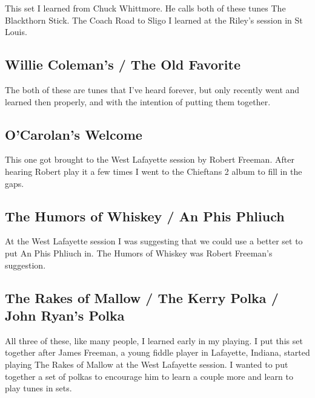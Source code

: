 \documentclass[11pt,letterpaper]{article}
\begin{document}
This set I learned from Chuck Whittmore. He calls both of these tunes The Blackthorn Stick. The Coach Road to Sligo I learned at the Riley's session in St Louis.

\subsection{Willie Coleman's / The Old Favorite}

The  both of these are tunes that I've heard forever, but only recently went and learned then properly, and with the intention of putting them together.

\subsection{O'Carolan's Welcome}

This one got brought to the West Lafayette session by Robert Freeman. After hearing Robert play it a few times I went to the Chieftans 2 album to fill in the gaps.

\subsection{The Humors of Whiskey / An Phis Phliuch}

At the West Lafayette session I was suggesting that we could use a better set to put An Phis Phliuch in. The Humors of Whiskey was Robert Freeman's suggestion. 

\subsection{The Rakes of Mallow / The Kerry Polka / John Ryan's Polka}

All three of these, like many people, I learned early in my playing. I put this set together after James Freeman, a young fiddle player in Lafayette, Indiana, started playing The Rakes of Mallow at the West Lafayette session. I wanted to put together a set of polkas to encourage him to learn a couple more and learn to play tunes in sets.
\end{document}
